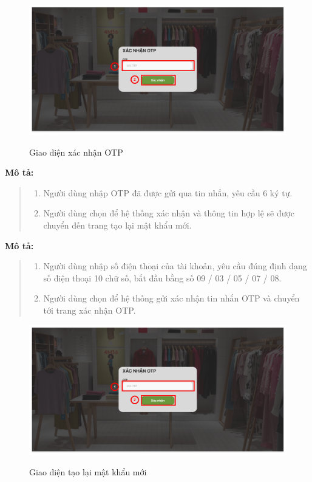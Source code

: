 \newpage
\begin{figure}[!htp]
    \centering
    \includegraphics[width=5in]{img/UI/customer/confirm_otp.png}
    \label{4}
    \newline
    \caption{Giao diện xác nhận OTP}
\end{figure}
\textbf{Mô tả:}
\begin{quote}
    \begin{enumerate}
        \item Người dùng nhập OTP đã được gửi qua tin nhắn, yêu cầu 6 ký tự.
        \item Người dùng chọn để hệ thống xác nhận và thông tin hợp lệ sẽ được chuyển đến trang tạo lại mật khẩu mới.
    \end{enumerate}
\end{quote}
\textbf{Mô tả:}
\begin{quote}
    \begin{enumerate}
        \item Người dùng nhập số điện thoại của tài khoản, yêu cầu đúng định dạng số điện thoại 10 chữ số, bắt đầu bằng số 09 / 03 / 05 / 07 / 08.
        \item Người dùng chọn để hệ thống gửi xác nhận tin nhắn OTP và chuyển tới trang xác nhận OTP.
    \end{enumerate}
\end{quote}
\begin{figure}[!htp]
    \centering
    \includegraphics[width=5in]{img/UI/customer/confirm_otp.png}
    \label{5}
    \newline
    \caption{Giao diện tạo lại mật khẩu mới}
\end{figure}
